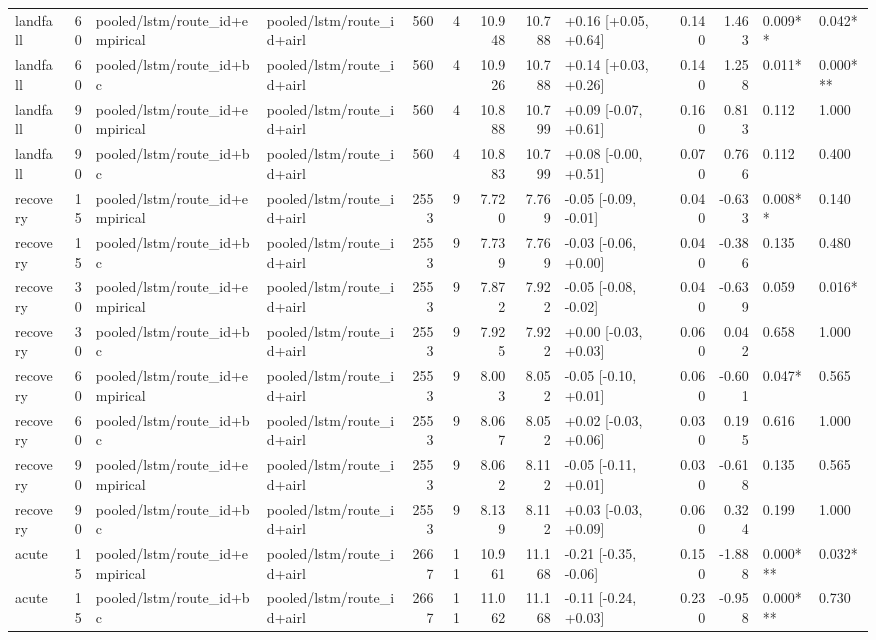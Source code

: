 \begin{tabular}{lrllrrrrlrrll}
landfall & 60 & pooled/lstm/route_id+empirical & pooled/lstm/route_id+airl & 560 & 4 & 10.948 & 10.788 & +0.16 [+0.05, +0.64] & 0.140 & 1.463 & 0.009** & 0.042* \\
landfall & 60 & pooled/lstm/route_id+bc & pooled/lstm/route_id+airl & 560 & 4 & 10.926 & 10.788 & +0.14 [+0.03, +0.26] & 0.140 & 1.258 & 0.011* & 0.000*** \\
landfall & 90 & pooled/lstm/route_id+empirical & pooled/lstm/route_id+airl & 560 & 4 & 10.888 & 10.799 & +0.09 [-0.07, +0.61] & 0.160 & 0.813 & 0.112 & 1.000 \\
landfall & 90 & pooled/lstm/route_id+bc & pooled/lstm/route_id+airl & 560 & 4 & 10.883 & 10.799 & +0.08 [-0.00, +0.51] & 0.070 & 0.766 & 0.112 & 0.400 \\
recovery & 15 & pooled/lstm/route_id+empirical & pooled/lstm/route_id+airl & 2553 & 9 & 7.720 & 7.769 & -0.05 [-0.09, -0.01] & 0.040 & -0.633 & 0.008** & 0.140 \\
recovery & 15 & pooled/lstm/route_id+bc & pooled/lstm/route_id+airl & 2553 & 9 & 7.739 & 7.769 & -0.03 [-0.06, +0.00] & 0.040 & -0.386 & 0.135 & 0.480 \\
recovery & 30 & pooled/lstm/route_id+empirical & pooled/lstm/route_id+airl & 2553 & 9 & 7.872 & 7.922 & -0.05 [-0.08, -0.02] & 0.040 & -0.639 & 0.059 & 0.016* \\
recovery & 30 & pooled/lstm/route_id+bc & pooled/lstm/route_id+airl & 2553 & 9 & 7.925 & 7.922 & +0.00 [-0.03, +0.03] & 0.060 & 0.042 & 0.658 & 1.000 \\
recovery & 60 & pooled/lstm/route_id+empirical & pooled/lstm/route_id+airl & 2553 & 9 & 8.003 & 8.052 & -0.05 [-0.10, +0.01] & 0.060 & -0.601 & 0.047* & 0.565 \\
recovery & 60 & pooled/lstm/route_id+bc & pooled/lstm/route_id+airl & 2553 & 9 & 8.067 & 8.052 & +0.02 [-0.03, +0.06] & 0.030 & 0.195 & 0.616 & 1.000 \\
recovery & 90 & pooled/lstm/route_id+empirical & pooled/lstm/route_id+airl & 2553 & 9 & 8.062 & 8.112 & -0.05 [-0.11, +0.01] & 0.030 & -0.618 & 0.135 & 0.565 \\
recovery & 90 & pooled/lstm/route_id+bc & pooled/lstm/route_id+airl & 2553 & 9 & 8.139 & 8.112 & +0.03 [-0.03, +0.09] & 0.060 & 0.324 & 0.199 & 1.000 \\
acute & 15 & pooled/lstm/route_id+empirical & pooled/lstm/route_id+airl & 2667 & 11 & 10.961 & 11.168 & -0.21 [-0.35, -0.06] & 0.150 & -1.888 & 0.000*** & 0.032* \\
acute & 15 & pooled/lstm/route_id+bc & pooled/lstm/route_id+airl & 2667 & 11 & 11.062 & 11.168 & -0.11 [-0.24, +0.03] & 0.230 & -0.958 & 0.000*** & 0.730 \\

\end{tabular}
